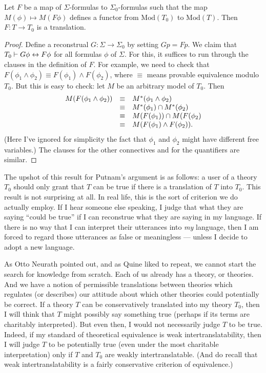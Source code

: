\begin{prop} Let $F$ be a map of $\Sigma$-formulas to
  $\Sigma _0$-formulas such that the map $M(\phi )\mapsto M(F\phi )$
  defines a functor from $\mathrm{Mod}(T_0)$ to $\mathrm{Mod}(T)$.
  Then $F:T\to T_0$ is a translation. \end{prop}

\begin{proof} Define a reconstrual $G:\Sigma\to\Sigma _0$ by setting
  $Gp=Fp$.  We claim that $T_0\vdash G\phi\leftrightarrow F\phi$ for all formulas
  $\phi$ of $\Sigma$.  For this, it suffices to run through the
  clauses in the definition of $F$.  For example, we need to check
  that $F(\phi _1\wedge \phi _2)\equiv F(\phi _1)\wedge F(\phi _2)$,
  where $\equiv$ means provable equivalence modulo $T_0$.  But this is
  easy to check: let $M$ be an arbitrary model of $T_0$.  Then
  \[ \begin{array}{l l l} M(F(\phi _1\wedge \phi _2)) & \equiv & M^*(\phi _1\wedge \phi _2) \\
    &\equiv & M^*(\phi _1)\cap  M^*(\phi _2) \\
     & \equiv & M(F(\phi _1))\cap M(F(\phi _2) \\
     &\equiv & M(F(\phi _1)\wedge F(\phi _2)) .\end{array} \]
(Here I've ignored for simplicity the fact that $\phi _1$ and $\phi _2$
might have different free variables.)  The clauses for the other
connectives and for the quantifiers are similar.  \end{proof}

The upshot of this result for Putnam's argument is as follows: a user
of a theory $T_0$ should only grant that $T$ can be true if there is a
translation of $T$ into $T_0$.  This result is not surprising at all.
In real life, this is the sort of criterion we do actually employ.  If
I hear someone else speaking, I judge that what they are saying
``could be true'' if I can reconstrue what they are saying in my
language.  If there is no way that I can interpret their utterances
into {\it my} language, then I am forced to regard those utterances as
false or meaningless --- unless I decide to adopt a new language.

\newcommand{\3}{\cal}

As Otto Neurath pointed out, and as Quine liked to repeat, we cannot
start the search for knowledge from scratch.  Each of us already has a
theory, or theories.  And we have a notion of permissible translations
between theories which regulates (or describes) our attitude about
which other theories could potentially be correct.  If a theory $T$
can be conservatively translated into my theory $T_0$, then I will
think that $T$ might possibly say something true (perhaps if its terms
are charitably interpreted).  But even then, I would not necessarily
judge $T$ to be true.  Indeed, if my standard of theoretical
equivalence is weak intertranslatability, then I will judge $T$ to be
potentially true (even under the most charitable interpretation) only
if $T$ and $T_0$ are weakly intertranslatable.  (And do recall that
weak intertranslatability is a fairly conservative criterion of
equivalence.)

